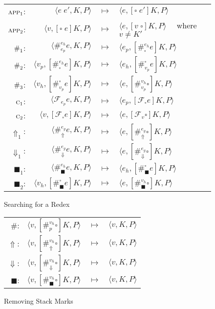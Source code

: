 \documentclass[11pt]{article}
\newcommand\F{\mathcal{F}}
\newcommand{\angles}[1]{\langle#1\rangle}
\begin{document}
\begin{figure}[H]
\caption{Searching for a Redex}
\label{fig:redexSearch}
\begin{tabular}{rrcl}
$\textsc{app}_1$: &
	$\angles{e\;e', K,P}$ & $\longmapsto$ &
	$\angles{e,[\square\;e']K,P}$ \\
$\textsc{app}_2$: &
	$\angles{v, [\square\;e]K,P}$ & $\longmapsto$ &
	$\angles{e,[v\;\square]K,P}\quad$ where $v \neq K'$ \\
$\textsc{\#}_1$: &
	$\angles{\#_{e_p}^{e_h}e, K, P}$ & $\longmapsto$ &
	$\angles{e_p,[\#_{\square}^{e_h}e]K, P}$ \\
$\textsc{\#}_2$: &
	$\angles{v_p, [\#_{\square}^{e_h}e]K, P}$ & $\longmapsto$ &
	$\angles{e_h,[\#_{v_p}^{\square}e]K, P}$ \\
$\textsc{\#}_3$: &
	$\angles{v_h, [\#_{v_p}^{\square}e]K, P}$ & $\longmapsto$ &
	$\angles{e,[\#_{v_p}^{v_h}\square]K, P}$ \\
$\textsc{c}_1$: &
	$\angles{\F_{e_p}e, K, P}$ & $\longmapsto$ &
	$\angles{e_p, [\F_\square e]K,P}$ \\
$\textsc{c}_2$: &
	$\angles{v, [\F_\square e]K, P}$ & $\longmapsto$ &
	$\angles{e, [\F_v \square]K, P}$ \\
$\Uparrow_1$: &
	$\angles{\#_\Uparrow^{e_g}e, K, P}$ & $\longmapsto$ &
	$\angles{e,[\#_\Uparrow^{e_g}\square]K, P}$ \\
$\Downarrow_1$: &
	$\angles{\#_\Downarrow^{e_g}e, K, P}$ & $\longmapsto$ &
	$\angles{e,[\#_\Downarrow^{e_g}\square]K, P}$ \\
$\blacksquare_1$: &
	$\angles{\#_\blacksquare^{e_h}e, K, P}$ & $\longmapsto$ &
	$\angles{e_h,[\#_\blacksquare^{\square}e]K, P}$ \\
$\blacksquare_2$: &
	$\angles{v_h, [\#_\blacksquare^{\square}e]K, P}$ & $\longmapsto$ &
	$\angles{e,[\#_\blacksquare^{v_h}\square]K, P}$ \\
\end{tabular}
\end{figure}

\begin{figure}[H]
\caption{Removing Stack Marks}
\label{fig:remove-stack-marks}
\begin{tabular}{rrcl}
$\#$: &
	$\angles{v, [\#_p^{v_h}\square]K, P}$ & $\longmapsto$ &
	$\angles{v, K, P}$ \\
$\Uparrow$: &
	$\angles{v, [\#_\Uparrow^{v_h}\square]K, P}$ & $\longmapsto$ &
	$\angles{v, K, P}$ \\
$\Downarrow$: &
	$\angles{v, [\#_\Downarrow^{v_h}\square]K, P}$ & $\longmapsto$ &
	$\angles{v, K, P}$ \\
$\blacksquare$: &
	$\angles{v, [\#_\blacksquare^{v_h}\square]K, P}$ & $\longmapsto$ &
	$\angles{v, K, P}$ \\
\end{tabular}
\end{figure}
\end{document}
